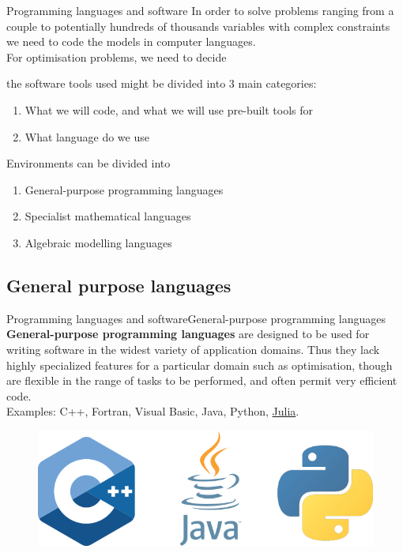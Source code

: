 \documentclass[handout]{beamer}
\begin{document}
\begin{frame}[t]{Programming languages and software}
  In order to solve problems ranging from a couple to potentially hundreds of thousands variables with complex constraints we need to code the models in computer languages.\\[12pt]

  For optimisation problems, we need to decide 
  
  the software tools used might be divided  into 3 main categories:
  \begin{enumerate}
    \item What we will code, and what we will use pre-built tools for
    \item What language do we use
  \end{enumerate}

  Environments can be divided into
  \begin{enumerate}
    \item General-purpose programming languages
    \item Specialist mathematical languages
    \item Algebraic modelling languages
  \end{enumerate}

\end{frame}



\subsection{General purpose languages}
\begin{frame}{Programming languages and software}{General-purpose programming languages}
\textbf{General-purpose programming languages} are designed to be used for writing software in the widest variety of application domains. Thus they lack highly specialized features for a particular domain such as optimisation, though are flexible in the range of tasks to be performed, and often permit very efficient code.\\[6pt]

Examples: C++, Fortran, Visual Basic, Java, Python, \underline{Julia}.\\[12pt]

\begin{figure}
\begin{center}
\includegraphics[width=.60\textwidth]{GeneralLang.png}
\end{center}
\end{figure}

\end{frame}
\end{document}
